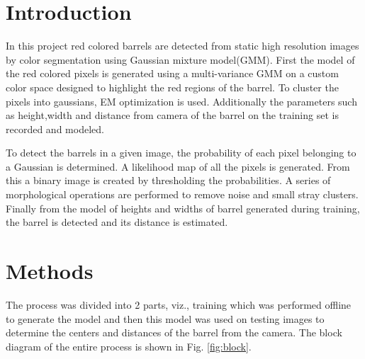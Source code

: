 \documentclass[fleqn,10pt]{SelfArx} %
\begin{document}
\flushbottom %

\maketitle %

\tableofcontents %

\thispagestyle{empty} %


\section{Introduction} %


In this project red colored barrels are detected from static high resolution images by color segmentation using Gaussian mixture model(GMM). First the model of the red colored pixels is generated using a multi-variance GMM on a custom color space designed to highlight the red regions of the barrel. To cluster the pixels into gaussians, EM optimization is used. Additionally the parameters such as height,width and distance from camera of the barrel on the training set is recorded and modeled.

To detect the barrels in a given image, the probability of each pixel belonging to a Gaussian is determined. A likelihood map of all the pixels is generated. From this a binary image is created by thresholding the probabilities. A series of morphological operations are performed to remove noise and small stray clusters. Finally from the model of heights and widths of barrel generated during training, the barrel is detected and its distance is estimated.


\section{Methods}
The process was divided into 2 parts, viz., training which was performed offline to generate the model and then this model was used on testing images to determine the centers and distances of the barrel from the camera. The block diagram of the entire process is shown in Fig. \ref{fig:block}.
\end{document}

